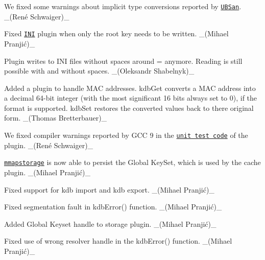 \begin{DoxyItemize}
\item We fixed some warnings about implicit type conversions reported by \href{https://clang.llvm.org/docs/UndefinedBehaviorSanitizer.html}{\tt U\+B\+San}. \+\_\+(René Schwaiger)\+\_\+
\end{DoxyItemize}


\begin{DoxyItemize}
\item Fixed \href{https://www.libelektra.org/plugins/ini}{\tt I\+NI} plugin when only the root key needs to be written. \+\_\+(Mihael Pranjić)\+\_\+
\item Plugin writes to I\+NI files without spaces around \textquotesingle{}=\textquotesingle{} anymore. Reading is still possible with and without spaces. \+\_\+(\+Oleksandr Shabelnyk)\+\_\+
\end{DoxyItemize}


\begin{DoxyItemize}
\item Added a plugin to handle M\+AC addresses. {\ttfamily kdb\+Get} converts a M\+AC address into a decimal 64-\/bit integer (with the most significant 16 bits always set to 0), if the format is supported. {\ttfamily kdb\+Set} restores the converted values back to there original form. \+\_\+(\+Thomas Bretterbauer)\+\_\+
\end{DoxyItemize}


\begin{DoxyItemize}
\item We fixed compiler warnings reported by G\+CC 9 in the \href{/home/jenkins/workspace/libelektra-release/src/plugins/mini/testmod_mini.c}{\tt unit test code} of the plugin. \+\_\+(René Schwaiger)\+\_\+
\end{DoxyItemize}


\begin{DoxyItemize}
\item \href{https://www.libelektra.org/plugins/mmapstorage}{\tt mmapstorage} is now able to persist the Global Key\+Set, which is used by the {\ttfamily cache} plugin. \+\_\+(Mihael Pranjić)\+\_\+
\item Fixed support for {\ttfamily kdb import} and {\ttfamily kdb export}. \+\_\+(Mihael Pranjić)\+\_\+
\end{DoxyItemize}


\begin{DoxyItemize}
\item Fixed segmentation fault in {\ttfamily kdb\+Error()} function. \+\_\+(Mihael Pranjić)\+\_\+
\item Added Global Keyset handle to storage plugin. \+\_\+(Mihael Pranjić)\+\_\+
\item Fixed use of wrong resolver handle in the {\ttfamily kdb\+Error()} function. \+\_\+(Mihael Pranjić)\+\_\+
\end{DoxyItemize}



